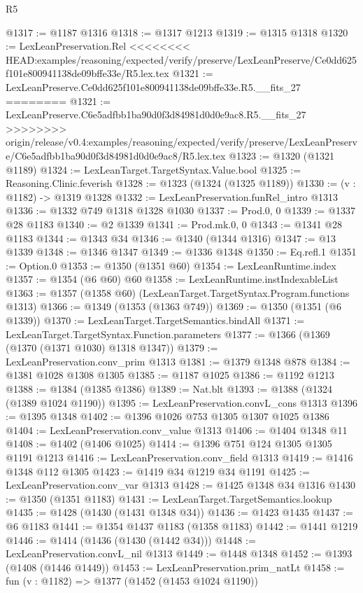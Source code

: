 \begin{lexlean}{R5}
\begin{coremodule}
{{{{{{{{{{{{{{{{{{{{{{{{{{{{{{{{{{{{{{{{{{{{{{{{{{{{{{{{{{{{{{{{{{{{{{{{{{{{{{{{{{{{@1317 := @1187 @1316
@1318 := @1317 @1213
@1319 := @1315 @1318
@1320 := LexLeanPreservation.Rel
<<<<<<<< HEAD:examples/reasoning/expected/verify/preserve/LexLeanPreserve/Ce0dd625f101e800941138de09bffe33e/R5.lex.tex
@1321 := LexLeanPreserve.Ce0dd625f101e800941138de09bffe33e.R5.__fits_27
========
@1321 := LexLeanPreserve.C6e5adfbb1ba90d0f3d84981d0d0e9ac8.R5.__fits_27
>>>>>>>> origin/release/v0.4:examples/reasoning/expected/verify/preserve/LexLeanPreserve/C6e5adfbb1ba90d0f3d84981d0d0e9ac8/R5.lex.tex
@1323 := @1320 (@1321 @1189)
@1324 := LexLeanTarget.TargetSyntax.Value.bool
@1325 := Reasoning.Clinic.feverish
@1328 := @1323 (@1324 (@1325 @1189))
@1330 := (v : @1182) -> @1319 @1328
@1332 := LexLeanPreservation.funRel_intro @1313
@1336 := @1332 @749 @1318 @1328 @1030
@1337 := Prod.{0, 0}
@1339 := @1337 @28 @1183
@1340 := @2 @1339
@1341 := Prod.mk.{0, 0}
@1343 := @1341 @28 @1183
@1344 := @1343 @34
@1346 := @1340 (@1344 @1316)
@1347 := @13 @1339
@1348 := @1346 @1347
@1349 := @1336 @1348
@1350 := Eq.refl.{1}
@1351 := Option.{0}
@1353 := @1350 (@1351 @60)
@1354 := LexLeanRuntime.index
@1357 := @1354 (@6 @60) @60
@1358 := LexLeanRuntime.instIndexableList
@1363 := @1357 (@1358 @60) (LexLeanTarget.TargetSyntax.Program.functions @1313)
@1366 := @1349 (@1353 (@1363 @749))
@1369 := @1350 (@1351 (@6 @1339))
@1370 := LexLeanTarget.TargetSemantics.bindAll
@1371 := LexLeanTarget.TargetSyntax.Function.parameters
@1377 := @1366 (@1369 (@1370 (@1371 @1030) @1318 @1347))
@1379 := LexLeanPreservation.conv_prim @1313
@1381 := @1379 @1348 @878
@1384 := @1381 @1028 @1308 @1305
@1385 := @1187 @1025
@1386 := @1192 @1213
@1388 := @1384 (@1385 @1386)
@1389 := Nat.blt
@1393 := @1388 (@1324 (@1389 @1024 @1190))
@1395 := LexLeanPreservation.convL_cons @1313
@1396 := @1395 @1348
@1402 := @1396 @1026 @753 @1305 @1307 @1025 @1386
@1404 := LexLeanPreservation.conv_value @1313
@1406 := @1404 @1348 @11
@1408 := @1402 (@1406 @1025)
@1414 := @1396 @751 @124 @1305 @1305 @1191 @1213
@1416 := LexLeanPreservation.conv_field @1313
@1419 := @1416 @1348 @112 @1305
@1423 := @1419 @34 @1219 @34 @1191
@1425 := LexLeanPreservation.conv_var @1313
@1428 := @1425 @1348 @34 @1316
@1430 := @1350 (@1351 @1183)
@1431 := LexLeanTarget.TargetSemantics.lookup
@1435 := @1428 (@1430 (@1431 @1348 @34))
@1436 := @1423 @1435
@1437 := @6 @1183
@1441 := @1354 @1437 @1183 (@1358 @1183)
@1442 := @1441 @1219
@1446 := @1414 (@1436 (@1430 (@1442 @34)))
@1448 := LexLeanPreservation.convL_nil @1313
@1449 := @1448 @1348
@1452 := @1393 (@1408 (@1446 @1449))
@1453 := LexLeanPreservation.prim_natLt
@1458 := fun (v : @1182) => @1377 (@1452 (@1453 @1024 @1190))
}}}}}}}}}}}}}}}}}}}}}}}}}}}}}}}}}}}}}}}}}}}}}}}}}}}}}}}}}}}}}}}}}}}}}}}}}}}}}}}}}}}}
\end{coremodule}
\end{lexlean}
